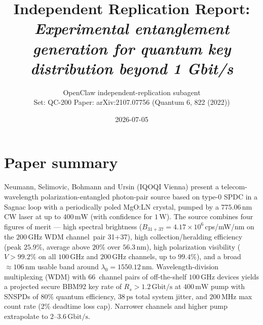 \documentclass[11pt]{article}
\title{Independent Replication Report:\\
  \emph{Experimental entanglement generation for quantum key distribution beyond 1 Gbit/s}}
\author{OpenClaw independent-replication subagent \\
        Set: QC-200 \quad Paper: arXiv:2107.07756 (Quantum 6, 822 (2022))}
\date{2026-07-05}
\begin{document}
\maketitle

\section{Paper summary}
Neumann, Selimovic, Bohmann and Ursin (IQOQI Vienna) present a
telecom-wavelength polarization-entangled photon-pair source based on
type-0 SPDC in a Sagnac loop with a periodically poled MgO:LN
crystal, pumped by a $775.06$\,nm CW laser at up to $400\,\mathrm{mW}$
(with confidence for $1\,\mathrm{W}$). The source combines four
figures of merit --- high spectral brightness
($B_{31+37}=4.17\times10^{6}$\,cps/mW/nm on the $200$\,GHz WDM channel~pair
31+37), high collection/heralding efficiency (peak $25.9\%$, average
above $20\%$ over $56.3$\,nm), high polarization visibility
($V>99.2\%$ on all $100$\,GHz and $200$\,GHz channels, up to $99.4\%$),
and a broad $\approx106$\,nm usable band around $\lambda_{0}=1550.12$\,nm.
Wavelength-division multiplexing (WDM) with $66$~channel pairs of
off-the-shelf $100$\,GHz devices yields a projected secure BBM92
key rate of $R_{s}>1.2\,\mathrm{Gbit/s}$ at $400\,\mathrm{mW}$ pump
with SNSPDs of $80\%$ quantum efficiency, $38\,\mathrm{ps}$ total system
jitter, and $200\,\mathrm{MHz}$ max count rate (2\% deadtime loss cap).
Narrower channels and higher pump extrapolate to $2\text{--}3.6\,\mathrm{Gbit/s}$.
\end{document}
